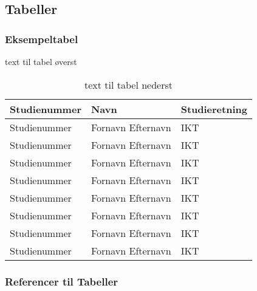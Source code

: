 \subsection{Tabeller}

\subsubsection{Eksempeltabel}

\begin{table}[H] %
    \caption{text til tabel øverst}
    \centering
\begin{tabular}{|l|l|l|}
    \hline
    \rowcolor{blue!25}
    \textbf{Studienummer} & \textbf{Navn} & \textbf{Studieretning} \\ [2pt]
    \hline
    Studienummer & Fornavn Efternavn & IKT \\
    \hline
    Studienummer & Fornavn Efternavn & IKT \\
    \hline
    Studienummer & Fornavn Efternavn & IKT \\
    \hline
    Studienummer & Fornavn Efternavn & IKT \\
    \hline
    Studienummer & Fornavn Efternavn & IKT \\
    \hline
    Studienummer & Fornavn Efternavn & IKT \\
    \hline
    Studienummer & Fornavn Efternavn & IKT \\
    \hline
    Studienummer & Fornavn Efternavn & IKT \\
    \hline
\end{tabular}

\caption{text til tabel nederst}
\end{table}

\subsubsection{Referencer til Tabeller}
\begin{verbatim}

\end{verbatim}